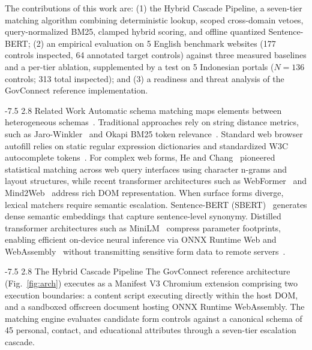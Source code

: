 \documentclass[runningheads,a4paper]{llncs}
\makeatletter
\renewcommand\section{\@startsection{section}{1}{\z@}%
  {-7.5\p@ \@plus -2\p@ \@minus -1\p@}%
  {2.8\p@ \@plus 1\p@}%
  {\normalfont\large\bfseries}}
\makeatother
\begin{document}
The contributions of this work are: (1) the Hybrid Cascade Pipeline, a seven-tier matching algorithm combining deterministic lookup, scoped cross-domain vetoes, query-normalized BM25, clamped hybrid scoring, and offline quantized Sentence-BERT; (2) an empirical evaluation on 5 English benchmark websites (177 controls inspected, 64 annotated target controls) against three measured baselines and a per-tier ablation, supplemented by a test on 5 Indonesian portals ($N=136$ controls; 313 total inspected); and (3) a readiness and threat analysis of the GovConnect reference implementation.

\section{Related Work}
Automatic schema matching maps elements between heterogeneous schemas~\cite{rahm}. Traditional approaches rely on string distance metrics, such as Jaro-Winkler~\cite{jaro,winkler} and Okapi BM25 token relevance~\cite{bm25}. Standard web browser autofill relies on static regular expression dictionaries and standardized W3C autocomplete tokens~\cite{chromium}. For complex web forms, He and Chang~\cite{he} pioneered statistical matching across web query interfaces using character n-grams and layout structures, while recent transformer architectures such as WebFormer~\cite{webformer} and Mind2Web~\cite{mind2web} address rich DOM representation. When surface forms diverge, lexical matchers require semantic escalation. Sentence-BERT (SBERT)~\cite{sbert} generates dense semantic embeddings that capture sentence-level synonymy. Distilled transformer architectures such as MiniLM~\cite{minilm} compress parameter footprints, enabling efficient on-device neural inference via ONNX Runtime Web and WebAssembly~\cite{onnxweb,transformersjs} without transmitting sensitive form data to remote servers~\cite{kairouz2021}.

\section{The Hybrid Cascade Pipeline}
The GovConnect reference architecture (Fig.~\ref{fig:arch}) executes as a Manifest V3 Chromium extension comprising two execution boundaries: a content script executing directly within the host DOM, and a sandboxed offscreen document hosting ONNX Runtime WebAssembly. The matching engine evaluates candidate form controls against a canonical schema of 45 personal, contact, and educational attributes through a seven-tier escalation cascade.
\end{document}
